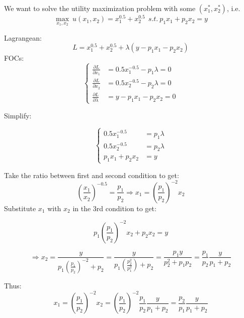 \documentclass{article}
\begin{document}
We want to solve the utility maximization problem with some $(x_1^*, x_2^*)$, i.e.
$$\max_{x_1,x_2} \ u(x_1,x_2) = x_1^{0.5} + x_2^{0.5} \ \ s.t. \ p_1x_1 + p_2x_2 = y$$


Lagrangean: $$L = x_1^{0.5} + x_2^{0.5} + \lambda (y - p_1x_1 -p_2x_2)$$
FOCs:
\begin{equation}
\begin{cases}
\frac{\partial L}{\partial x_1} &= 0.5x_1^{-0.5} -p_1\lambda = 0 \\
\frac{\partial L}{\partial x_2} &= 0.5x_2^{-0.5} -p_2\lambda = 0 \\
\frac{\partial L}{\partial \lambda} &= y - p_1x_1 -p_2x_2 =0
\end{cases}
\nonumber
\end{equation}

Simplify:

\begin{equation}
\begin{cases}
0.5x_1^{-0.5} &= p_1\lambda \\
0.5x_2^{-0.5} &= p_2\lambda \\
p_1x_1 + p_2x_2 &= y
\end{cases}
\end{equation}

Take the ratio between first and second condition to get:
$$(\frac{x_1}{x_2})^{-0.5} = \frac{p_1}{p_2} \Rightarrow x_1 = (\frac{p_1}{p_2})^{-2}x_2 $$
Substitute $x_1$ with $x_2$ in the 3rd condition to get:

$$p_1(\frac{p_1}{p_2})^{-2}x_2 + p_2x_2 = y$$ 

$$\Rightarrow x_2 = \frac{y}{p_1(\frac{p_1}{p_2})^{-2} + p_2} = \frac{y}{p_1(\frac{p_2^2}{p_1^2}) + p_2} =\frac{p_1y}{p_2^2 + p_1p_2} = \frac{p_1}{p_2}\frac{y}{p_1 + p_2}$$

Thus:
$$x_1 = (\frac{p_1}{p_2})^{-2}x_2 = (\frac{p_1}{p_2})^{-2}\frac{p_1}{p_2}\frac{y}{p_1 + p_2} =\frac{p_2}{p_1}\frac{y}{p_1 + p_2}$$
\end{document}
